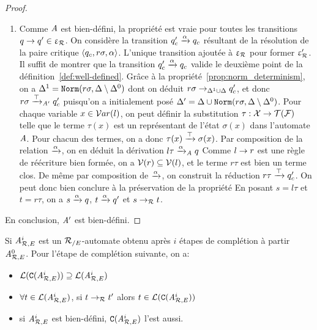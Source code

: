 \begin{proof}
\begin{enumerate}
\item \label{two}
  Comme $\mathit A$ est bien-défini, la propriété est vraie pour toutes les transitions $q \rightarrow q'\in \upvarepsilon_{\mathcal R}$.
  On considère la transition $q'_c \xrightarrow{\alpha} q_c$ résultant de la résolution de la paire critique $\langle q_c ,r\sigma,\alpha\rangle$. 
  L'unique transition ajoutée à $\upvarepsilon_{\mathcal R}$ pour former $\upvarepsilon_{\mathcal R}'$. Il suffit de montrer que la transition $q'_c \xrightarrow{\alpha} q_c$
  valide le deuxième point de la définition~\ref{def:well-defined}.
  Grâce à la propriété~\ref{prop:norm_determinism}, on a $\Delta^1 = \mathtt{Norm}(r\sigma,\Delta\setminus\Delta^0)$ dont on
  déduit $r\sigma \rightarrow_{\Delta^1\cup\Delta} q'_c$, et donc $r\sigma \xrightarrow{\top}_{\mathit A'} q'_c$ puisqu'on a initialement posé 
  $\Delta' = \Delta \cup \mathtt{Norm}(r\sigma,\Delta\setminus\Delta^0)$.
  Pour chaque variable $x\in\mathcal{ V}ar(l)$, on peut définir la substitution $\tau:\mathcal X \rightarrow \mathcal{T(F)}$ 
  telle que le terme $\tau(x)$ est un représentant de l'état $\sigma(x)$ dans l'automate $\mathit A$.
  Pour chacun des termes, on a donc $\tau(x) \xrightarrow{\top} \sigma(x)$.
  Par composition de la relation $\xrightarrow{\alpha}$, on en déduit la dérivation $l\tau\xrightarrow{\alpha}_\mathit A q$
  Comme $l\rightarrow r$ est une règle de réécriture bien formée, on a $\mathcal V(r) \subseteq \mathcal V(l)$,
  et le terme $r\tau$ est bien un terme clos. De même par composition de $\xrightarrow{\alpha}$, 
  on construit la réduction $r\tau \xrightarrow{\top} q'_c$. On peut donc bien conclure à la préservation de la propriété
  En posant $s=l\tau$ et $t=r\tau$, on a $s\xrightarrow{\alpha}q $, $t\xrightarrow{\alpha}q' $ et $s\rightarrow_\mathcal R t $.
\end{enumerate}
En conclusion, $\mathit A'$ est bien-défini.
\end{proof}

\begin{theorem}
  \label{thm:C}
  Si ${\mathit A}_{\mathcal R,E}^i$ est un ${\mathcal R_{/E}}$-automate obtenu après $i$ étapes de complétion à partir ${\mathit A}_{\mathcal R,E}^0$.
  Pour l'étape de complétion suivante, on a:
  \begin{itemize}
  \item $\mathcal{L}(\mathtt{C}({\mathit A}_{\mathcal R,E}^i)) \supseteq \mathcal{L}({\mathit A}_{\mathcal R,E}^i)$
  \item $\forall t \in \mathcal{L}({\mathit A}_{\mathcal R,E}^i)$, si $t \rightarrow_\mathcal R t'$ alors $t \in \mathcal{L}(\mathtt{C}({\mathit A}_{\mathcal R,E}^i))$
  \item si ${\mathit A}_{\mathcal R,E}^i$ est bien-défini, $\mathtt{C}({\mathit A}_{\mathcal R,E}^i)$ l'est aussi.
  \end{itemize}
\end{theorem}

